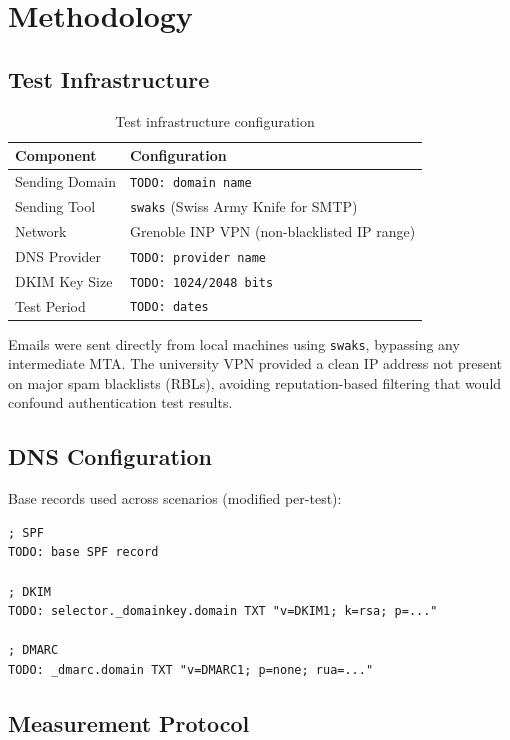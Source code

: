 \documentclass[11pt,a4paper]{article}
\begin{document}
\section{Methodology}

\subsection{Test Infrastructure}

\begin{table}[h]
\centering
\begin{tabular}{ll}
\toprule
\textbf{Component} & \textbf{Configuration} \\
\midrule
Sending Domain & \texttt{TODO: domain name} \\
Sending Tool & \texttt{swaks} (Swiss Army Knife for SMTP) \\
Network & Grenoble INP VPN (non-blacklisted IP range) \\
DNS Provider & \texttt{TODO: provider name} \\
DKIM Key Size & \texttt{TODO: 1024/2048 bits} \\
Test Period & \texttt{TODO: dates} \\
\bottomrule
\end{tabular}
\caption{Test infrastructure configuration}
\end{table}

Emails were sent directly from local machines using \texttt{swaks}, bypassing any intermediate MTA. The university VPN provided a clean IP address not present on major spam blacklists (RBLs), avoiding reputation-based filtering that would confound authentication test results.

\subsection{DNS Configuration}

Base records used across scenarios (modified per-test):

\begin{lstlisting}
; SPF
TODO: base SPF record

; DKIM
TODO: selector._domainkey.domain TXT "v=DKIM1; k=rsa; p=..."

; DMARC
TODO: _dmarc.domain TXT "v=DMARC1; p=none; rua=..."
\end{lstlisting}

\subsection{Measurement Protocol}
\end{document}
